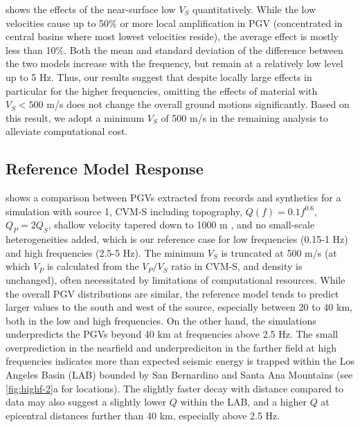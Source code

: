 shows the effects of the near-surface low $V_S$ quantitatively. While the low velocities cause up to 50\% or more local amplification in PGV (concentrated in central basins where most lowest velocities reside), the average effect is mostly less than 10\%. Both the mean and standard deviation of the difference between the two models increase with the frequency, but remain at a relatively low level up to 5 Hz. Thus, our results suggest that despite locally large effects in particular for the higher frequencies, omitting the effects of material with $V_S < 500$ m/s does not change the overall ground motions significantly. Based on this result, we adopt a minimum $V_S$ of 500 m/s in the remaining analysis to alleviate computational cost.


\subsection{Reference Model Response}
 shows a comparison between PGVs extracted from records and synthetics for a simulation with source 1, CVM-S including topography, $Q(f)=0.1f^{0.6}$, $Q_P=2Q_S$, shallow velocity tapered down to 1000 m \citep{huCalibrationNearsurfaceSeismic2021}, and no small-scale heterogeneities added, which is our reference case for low frequencies (0.15-1 Hz) and high frequencies (2.5-5 Hz). The minimum $V_S$ is truncated at 500 m/s (at which $V_P$ is calculated from the $V_P/V_S$ ratio in CVM-S, and density is unchanged), often necessitated by limitations of computational resources. While the overall PGV distributions are similar, the reference model tends to predict larger values to the south and west of the source, especially between 20 to 40 km, both in the low and high frequencies. On the other hand, the simulations underpredicts the PGVs beyond 40 km at frequencies above 2.5 Hz. The small overprediction in the nearfield and underprediciton in the farther field at high frequencies indicates more than expected seismic energy is trapped within the Los Angeles Basin (LAB) bounded by San Bernardino and Santa Ana Mountains (see \cref{fig:highf-2}a for locations). The slightly faster decay with distance compared to data may also suggest a slightly lower $Q$ within the LAB, and a higher $Q$ at epicentral distances further than 40 km, especially above 2.5 Hz.


